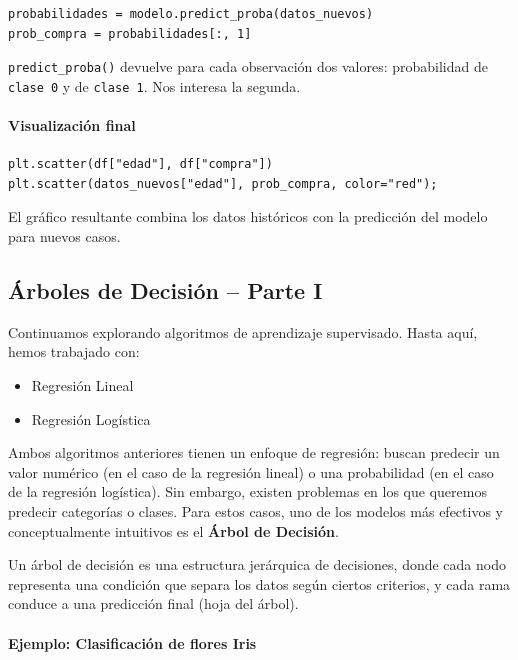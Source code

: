 \documentclass{article}
\theoremstyle{nonumberplain}
\begin{document}
\begin{verbatim}
probabilidades = modelo.predict_proba(datos_nuevos)
prob_compra = probabilidades[:, 1]
\end{verbatim}

\texttt{predict\_proba()} devuelve para cada observación dos valores: probabilidad de \texttt{clase 0} y de \texttt{clase 1}. Nos interesa la segunda.

\paragraph{Visualización final}

\begin{verbatim}
plt.scatter(df["edad"], df["compra"])
plt.scatter(datos_nuevos["edad"], prob_compra, color="red");
\end{verbatim}

El gráfico resultante combina los datos históricos con la predicción del modelo para nuevos casos.

\subsection*{Árboles de Decisión – Parte I}

Continuamos explorando algoritmos de aprendizaje supervisado. Hasta aquí, hemos trabajado con:

\begin{itemize}
    \item Regresión Lineal
    \item Regresión Logística
\end{itemize}

Ambos algoritmos anteriores tienen un enfoque de regresión: buscan predecir un valor numérico (en el caso de la regresión lineal) o una probabilidad (en el caso de la regresión logística). Sin embargo, existen problemas en los que queremos predecir categorías o clases. Para estos casos, uno de los modelos más efectivos y conceptualmente intuitivos es el \textbf{Árbol de Decisión}.

Un árbol de decisión es una estructura jerárquica de decisiones, donde cada nodo representa una condición que separa los datos según ciertos criterios, y cada rama conduce a una predicción final (hoja del árbol).

\paragraph{Ejemplo: Clasificación de flores Iris}
\end{document}
